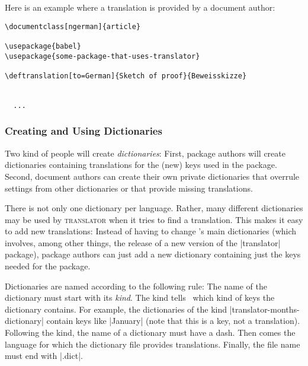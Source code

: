 Here is an example where a translation is provided by a document author:
\begin{verbatim}
\documentclass[ngerman]{article}

\usepackage{babel}
\usepackage{some-package-that-uses-translator}

\deftranslation[to=German]{Sketch of proof}{Beweisskizze}


  ...

\end{verbatim}

\subsubsection{Creating and Using Dictionaries}
\label{section-dictionaries}

Two kind of people will create \emph{dictionaries}: First, package authors will create dictionaries containing translations for the (new) keys used in the package. Second, document authors can create their own private dictionaries that overrule settings from other dictionaries or that provide missing translations.

There is not only one dictionary per language. Rather, many different dictionaries may be used by \textsc{translator} when it tries to find a translation. This makes it easy to add new translations: Instead of having to change \translatorname's main dictionaries (which involves, among other things, the release of a new version of the |translator| package), package authors can just add a new dictionary containing just the keys needed for the package.

Dictionaries are named according to the following rule: The name of the dictionary must start with its \emph{kind}. The kind tells \translatorname\ which kind of keys the dictionary contains. For example, the dictionaries of the kind |translator-months-dictionary| contain keys like |January| (note that this is a key, not a translation). Following the kind, the name of a dictionary must have a dash. Then comes the language for which the dictionary file provides translations. Finally, the file name must end with |.dict|.

